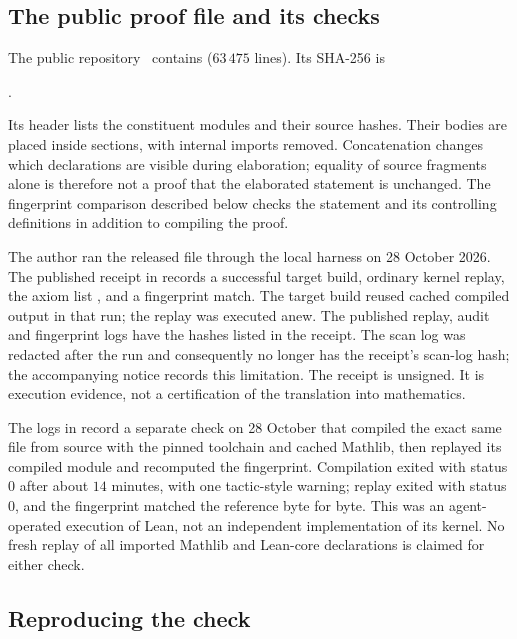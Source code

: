 \documentclass[11pt,a4paper]{article}
\theoremstyle{definition}
\theoremstyle{remark}
\numberwithin{equation}{section}
\begin{document}
\subsection{The public proof file and its checks}\label{sec:formal-records}

The public repository~\cite{feld-deep} contains  ($63\,475$ lines). Its SHA-256 is
\begin{center}\small
{}.
\end{center}
Its header lists the constituent modules and their source hashes. Their bodies are placed inside sections, with internal imports removed. Concatenation changes which declarations are visible during elaboration; equality of source fragments alone is therefore not a proof that the elaborated statement is unchanged. The fingerprint comparison described below checks the statement and its controlling definitions in addition to compiling the proof.

The author ran the released file through the local harness on 28 October 2026. The published receipt in  records a successful target build, ordinary kernel replay, the axiom list , and a fingerprint match. The target build reused cached compiled output in that run; the replay was executed anew. The published replay, audit and fingerprint logs have the hashes listed in the receipt. The scan log was redacted after the run and consequently no longer has the receipt's scan-log hash; the accompanying notice records this limitation. The receipt is unsigned. It is execution evidence, not a certification of the translation into mathematics.

The logs in  record a separate check on 28 October that compiled the exact same file from source with the pinned toolchain and cached Mathlib, then replayed its compiled module and recomputed the fingerprint. Compilation exited with status $0$ after about $14$ minutes, with one tactic-style warning; replay exited with status $0$, and the fingerprint matched the reference byte for byte. This was an agent-operated execution of Lean, not an independent implementation of its kernel. No fresh replay of all imported Mathlib and Lean-core declarations is claimed for either check.

\subsection{Reproducing the check}\label{sec:formal-local}
\end{document}
